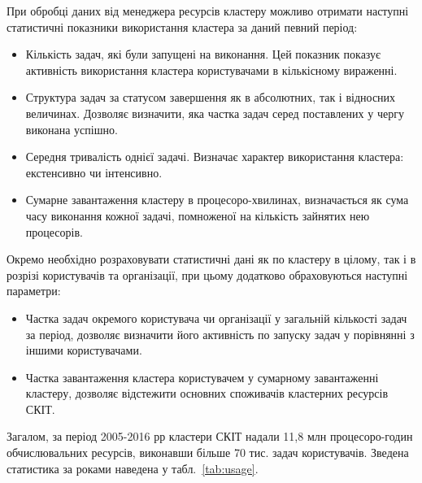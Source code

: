 При обробці даних від менеджера ресурсів кластеру можливо отримати наступні статистичні показники використання кластера за даний певний період:
\begin{itemize}
 \item Кількість задач, які були запущені на виконання. Цей показник показує активність використання кластера користувачами в кількісному вираженні.
 \item Структура задач за статусом завершення як в абсолютних, так і відносних величинах. Дозволяє визначити, яка частка задач серед поставлених у чергу виконана успішно.
 \item Середня тривалість однієї задачі. Визначає характер використання кластера: екстенсивно чи інтенсивно.
 \item Сумарне завантаження кластеру в процесоро-хвилинах, визначається як сума часу виконання кожної задачі, помноженої на кількість зайнятих нею процесорів. 
\end{itemize}


Окремо необхідно розраховувати статистичні дані як по кластеру в цілому, так і в розрізі користувачів та організації, при цьому додатково обраховуються наступні параметри:
\begin{itemize}
 \item Частка задач окремого користувача чи організації у загальній кількості задач за період, дозволяє визначити його активність по запуску задач у порівнянні з іншими користувачами. 
 \item Частка завантаження кластера користувачем у сумарному завантаженні кластеру, дозволяє відстежити основних споживачів кластерних ресурсів СКІТ.
\end{itemize}

Загалом, за період 2005-2016 рр кластери СКІТ надали 11,8 млн процесоро-годин обчислювальних ресурсів, виконавши більше 70 тис. задач користувачів. Зведена статистика за роками наведена у табл.~\ref{tab:usage}.


